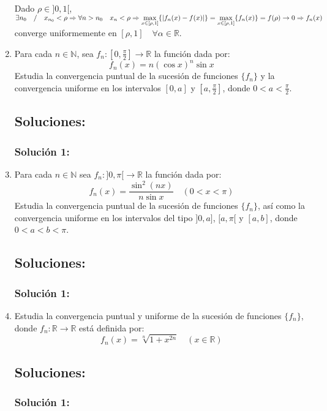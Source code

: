 \documentclass[a4paper, 11pt]{article} %
\begin{document}
\begin{enumerate}
  		Dado $\rho \in ]0,1[$, $\exists n_0 \quad / \quad x_{n_0} < \rho \Rightarrow \forall n > n_0
  		\quad x_n < \rho \Rightarrow \\ \displaystyle{\max_{x \in [\rho,1]} \{|f_n(x) - f(x)|\} } = 
  		\displaystyle{\max_{x \in [\rho,1]} \{f_n(x)\}} = f(\rho) \rightarrow 0 \Rightarrow f_n(x)$
  		converge uniformemente en $[\rho,1] \quad \forall \alpha \in \mathbb{R}$.

	\item Para cada $n \in \mathbb{N}$, sea $f_n: \left[0, \frac{\pi}{2}\right] \rightarrow \mathbb{R}$
	la función dada por:
	$$f_n(x) = n(\cos x)^n \sin x$$
	Estudia la convergencia puntual de la sucesión de funciones $\{f_n\}$ y la convergencia
	uniforme en los intervalos $[0, a]$ y $\left[a,\frac{\pi}{2}\right]$, donde $0 < a < \frac{\pi}{2}$.
	\subsection*{Soluciones:}
		\subsubsection*{Solución 1:}
	
	\item Para cada $n \in \mathbb{N}$ sea $f_n: ]0, \pi[ \rightarrow \mathbb{R}$ la función dada por:
	$$f_n(x) = \frac{\sin^2(nx)}{n\sin x} \quad (0 < x < \pi)$$
	Estudia la convergencia puntual de la sucesión de funciones $\{f_n\}$, así como la convergencia
	uniforme en los intervalos del tipo $]0, a]$, $[a,\pi[$ y $[a,b]$, donde $0 < a < b < \pi$.
	\subsection*{Soluciones:}
		\subsubsection*{Solución 1:}
	
	\item Estudia la convergencia puntual y uniforme de la sucesión de funciones $\{f_n\}$, donde
	$f_n: \mathbb{R} \rightarrow \mathbb{R}$ está definida por:
	$$f_n(x) = \sqrt[n]{1+x^{2n}} \quad (x \in \mathbb{R})$$
	\subsection*{Soluciones:}
		\subsubsection*{Solución 1:}
	

\end{enumerate}
\end{document}

